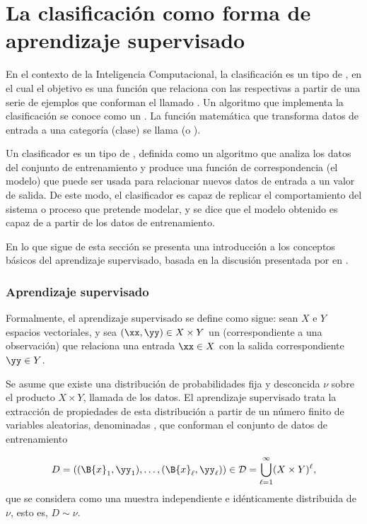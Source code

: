 \section{La clasificación como forma de aprendizaje supervisado}
En el contexto de la Inteligencia Computacional, la clasificación es
un tipo de , en el cual el objetivo es
 una función que relaciona  con las
respectivas  a partir de una serie de ejemplos que
conforman el llamado .  Un algoritmo que
implementa la clasificación se conoce como un . La
función matemática que transforma datos de entrada a una categoría
(clase) se llama  (o ).

Un clasificador es un tipo de , definida
como un algoritmo que analiza los datos del conjunto de entrenamiento
y produce una función de correspondencia (el modelo) que puede ser
usada para relacionar nuevos datos de entrada a un valor de salida.
De este modo, el clasificador es capaz de replicar el comportamiento
del sistema o proceso que pretende modelar, y se dice que el modelo
obtenido es capaz de  a partir de los datos de
entrenamiento.

En lo que sigue de esta sección se presenta una introducción a los
conceptos básicos del aprendizaje supervisado, basada
en la discusión presentada por \citeauthor{glasmachers} en
\cite{glasmachers}.

\subsubsection{Aprendizaje supervisado}
Formalmente, el aprendizaje supervisado se define como sigue: sean $X$
e $Y$ espacios vectoriales, y sea $(\xx,\yy)\in{}X\times{}Y$ un
 (correspondiente a una observación) que relaciona una
entrada $\xx\in{}X$ con la salida correspondiente $\yy\in{}Y$.

Se asume que existe una distribución de probabilidades fija y
desconcida $\nu$ sobre el producto $X\times Y$, llamada
 de los datos.  El aprendizaje supervisado
trata la extracción de propiedades de esta distribución a partir de un
número finito de variables aleatorias, denominadas , que
conforman el conjunto de datos de entrenamiento

\begin{align}
  D = \left((\B{x}_1,\yy_1),\ldots,(\B{x}_\ell,\yy_\ell)\right) \in
  \mathcal{D}=\bigcup_{\ell=1}^\infty (X\times Y)^\ell,
\end{align}
que se considera como una muestra independiente e idénticamente
distribuida de $\nu$, esto es, $D\sim\nu$.

